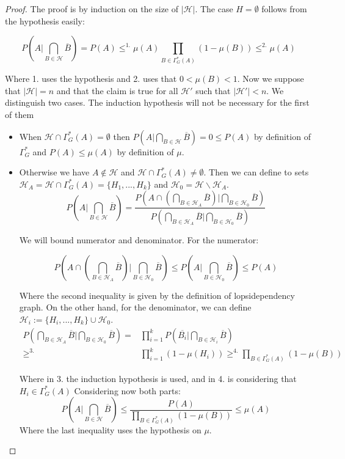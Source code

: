 \begin{proof}

The proof is by induction on the size of $|\mathcal{H}|$. The case $H=\emptyset$ follows from the hypothesis easily:

$$ 
	P\left ( A \Big| \bigcap_{B\in \mathcal{H}} \overline{B}\right ) =  P(A) \le^{1.}   \mu(A) \prod_{B\in\Gamma^*_G(A)} (1-\mu(B)) \le^{2.} \mu(A) $$

Where 1. uses the hypothesis and 2. uses that $0 < \mu(B) < 1$. Now we suppose that $|\mathcal{H}|=n$ and that the claim is true for all $\mathcal{H}'$ such that $|\mathcal{H}'|<n$. We distinguish two cases. The induction hypothesis will not be necessary for the first of them
\begin{itemize}
\item When $\mathcal{H} \cap \Gamma^*_G(A) = \emptyset$ then  $	P\left ( A \Big| \bigcap_{B\in \mathcal{H}} \overline{B}\right ) = 0 \le P(A)$ by definition of $\Gamma_G^*$ and $P(A) \le \mu(A)$ by definition of $\mu$.
\item Otherwise we have $A\not \in \mathcal{H}$ and $\mathcal{H} \cap \Gamma^*_G(A) \ne \emptyset$. Then we can define to sets $\mathcal{H}_A = \mathcal{H} \cap \Gamma^*_G(A) = \{H_1,...,H_k\}$ and $\mathcal{H}_0 = \mathcal{H}  \backslash \mathcal{H}_A$. 
\[
	P\left ( A \Big| \bigcap_{B\in \mathcal{H}} \overline{B} \right ) = \frac{P\left ( A \cap \left ( \bigcap_{B\in \mathcal{H}_A} \overline{B} \right ) \Big| \bigcap_{B\in \mathcal{H}_0} \overline{B} \right )
	}{P\left ( \bigcap_{B\in \mathcal{H}_A} \overline{B}  \Big| \bigcap_{B\in \mathcal{H}_0} \overline{B} \right )}
\]

We will bound numerator and denominator. For the numerator:

\[
P\left ( A \cap \left ( \bigcap_{B\in \mathcal{H}_A} \overline{B} \right ) \Big| \bigcap_{B\in \mathcal{H}_0} \overline{B} \right ) \le P\left ( A \Big| \bigcap_{B\in \mathcal{H}_0} \overline{B} \right ) \le P(A)
\]

Where the second inequality is given by the definition of lopsidependency graph. On the other hand, for the denominator, we can define $\mathcal{H}_i := \{H_i,...,H_k\} \cup \mathcal{H}_0$.
\begin{align*}
P\left ( \bigcap_{B\in \mathcal{H}_A} \overline{B}  \Big| \bigcap_{B\in \mathcal{H}_0} \overline{B} \right )  = & \prod_{i=1}^k P\left ( \overline{B_i} \Big| \bigcap_{B\in \mathcal{H}_i} \overline{B} \right ) \\  \ge^{3.}  & \prod_{i=1}^k \left (1-\mu(H_i)\right ) 
 \ge^{4.}  \prod_{B\in\Gamma_G^*(A)} \left (1-\mu(B)\right )
\end{align*}

Where in 3. the induction hypothesis is used, and in 4. is considering  that $H_i \in \Gamma_G^*(A)$
Considering now both parts:
\[
P\left ( A \Big| \bigcap_{B\in \mathcal{H}} \overline{B} \right ) \le \frac{P(A)}{\prod_{B\in\Gamma_G^*(A)} \left (1-\mu(B)\right )} \le \mu(A)
\]
Where the last inequality uses the hypothesis on $\mu$.
\end{itemize}
\end{proof}


